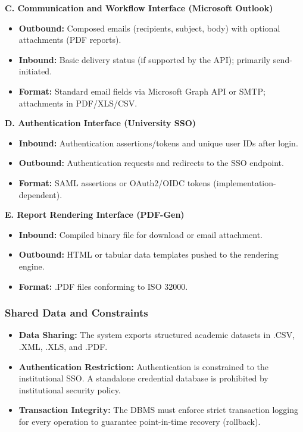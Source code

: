 \documentclass[11pt, a4paper]{article}
\begin{document}
\textbf{C. Communication and Workflow Interface (Microsoft Outlook)}
\begin{itemize}
    \item \textbf{Outbound:} Composed emails (recipients, subject, body) with optional attachments (PDF reports).
    \item \textbf{Inbound:} Basic delivery status (if supported by the API); primarily send-initiated.
    \item \textbf{Format:} Standard email fields via Microsoft Graph API or SMTP; attachments in PDF/XLS/CSV.
\end{itemize}

\textbf{D. Authentication Interface (University SSO)}
\begin{itemize}
    \item \textbf{Inbound:} Authentication assertions/tokens and unique user IDs after login.
    \item \textbf{Outbound:} Authentication requests and redirects to the SSO endpoint.
    \item \textbf{Format:} SAML assertions or OAuth2/OIDC tokens (implementation-dependent).
\end{itemize}

\textbf{E. Report Rendering Interface (PDF-Gen)}
\begin{itemize}
    \item \textbf{Inbound:} Compiled binary file for download or email attachment.
    \item \textbf{Outbound:} HTML or tabular data templates pushed to the rendering engine.
    \item \textbf{Format:} .PDF files conforming to ISO 32000.
\end{itemize}

\subsubsection{Shared Data and Constraints}
\begin{itemize}
    \item \textbf{Data Sharing:} The system exports structured academic datasets in .CSV, .XML, .XLS, and .PDF.
    \item \textbf{Authentication Restriction:} Authentication is constrained to the institutional SSO. A standalone credential database is prohibited by institutional security policy.
    \item \textbf{Transaction Integrity:} The DBMS must enforce strict transaction logging for every operation to guarantee point-in-time recovery (rollback).
\end{itemize}
\end{document}
